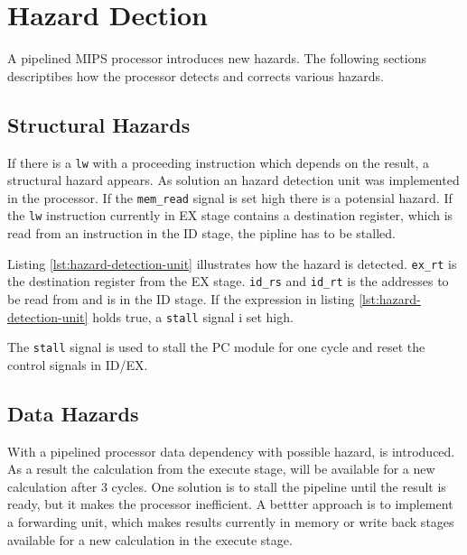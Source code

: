 \section{Hazard Dection}
A pipelined MIPS processor introduces new hazards.
The following sections descriptibes how the processor detects and corrects various hazards.

\subsection{Structural Hazards}
If there is a \texttt{lw} with a proceeding instruction which depends on the result,
a structural hazard appears.
As solution an hazard detection unit was implemented in the processor.
If the \texttt{mem\_read} signal is set high there is a potensial hazard.
If the \texttt{lw} instruction currently in EX stage contains a destination register,
which is read from an instruction in the ID stage, the pipline has to be stalled.

Listing \ref{lst:hazard-detection-unit} illustrates how the hazard is detected.
\texttt{ex\_rt} is the destination register from the EX stage.
\texttt{id\_rs} and \texttt{id\_rt} is the addresses to be read from and is in the ID stage.
If the expression in listing \ref{lst:hazard-detection-unit} holds true, a \texttt{stall} signal i set high.

The \texttt{stall} signal is used to stall the PC module for one cycle and reset the control signals in ID/EX.


\subsection{Data Hazards}
With a pipelined processor data dependency with possible hazard, is introduced.
As a result the calculation from the execute stage, will be available for a new calculation after 3 cycles.
One solution is to stall the pipeline until the result is ready, but it makes the processor inefficient.
A bettter approach is to implement a forwarding unit,
which makes results currently in memory or write back stages available for a new calculation in the execute stage.


